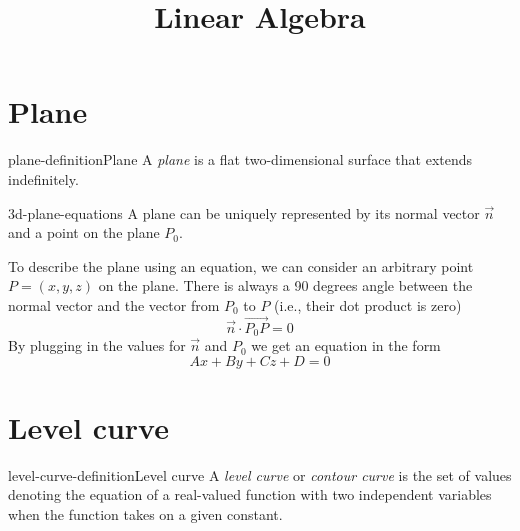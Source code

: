 \documentclass[preview]{standalone}
\begin{document}
\title{Linear Algebra}
\genpage

\section{Plane}

\begin{snippetdefinition}{plane-definition}{Plane}
    A \textit{plane} is a flat two-dimensional surface that extends indefinitely.
\end{snippetdefinition}

\begin{snippet}{3d-plane-equations}
A plane can be uniquely represented by its
normal vector \(\vec{n}\)
and a point on the plane \(P_0\).

To describe the plane using an equation, we can
consider an arbitrary point \(P=(x,y,z)\) on the plane.
There is always a 90 degrees angle between the normal
vector and the vector from \(P_0\) to \(P\) (i.e., their dot product is zero)
\[
    \vec{n} \cdot \overrightarrow{P_0 P} = 0
\]
By plugging in the values for \(\vec{n}\) and \(P_0\)
we get an equation in the form
\[
    Ax+By+Cz+D=0
\]
\end{snippet}

\section{Level curve}

\begin{snippetdefinition}{level-curve-definition}{Level curve}
    A \textit{level curve} or \textit{contour curve}
    is the set of values denoting the equation
    of a real-valued function with two independent variables
    when the function takes on a given constant.
\end{snippetdefinition}

\end{document}
